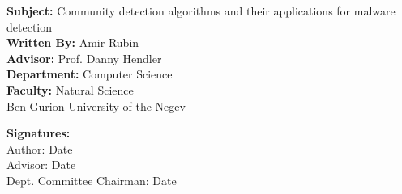 \begin{titlepage}

\begin{flushleft}

\textbf{Subject:} Community detection algorithms and their applications for malware detection \\
\textbf{Written By:} Amir Rubin \\
\textbf{Advisor:} Prof. Danny Hendler \\
\textbf{Department:} Computer Science \\
\textbf{Faculty:} Natural Science \\
Ben-Gurion University of the Negev \\

\vspace{\fill}

\textbf{Signatures:}\\

Author: \underline{\qquad \qquad \qquad \qquad \qquad \qquad \qquad \qquad}
\hfill 
Date\underline{\qquad \qquad \qquad \qquad}\\

Advisor: \underline{\qquad \qquad \qquad \qquad \qquad \qquad \qquad \qquad}
\hfill 
Date\underline{\qquad \qquad \qquad \qquad}\\
 
Dept. Committee Chairman:\underline{\qquad \qquad \qquad \qquad}
\hfill 
Date\underline{\qquad \qquad \qquad \qquad}
\end{flushleft}
\end{titlepage}
